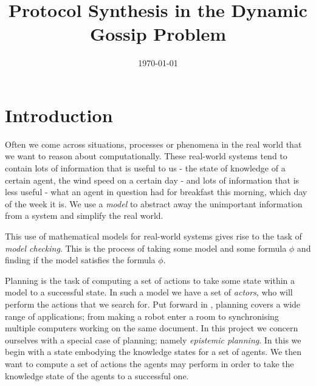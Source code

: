 \documentclass[ %
                    author={Leo Poulson},
                supervisor={Dr. Steven Ramsay},
                    degree={BSc},
                     title={Epistemic Planning for the Dynamic Gossip problem},
                  subtitle={},
                      year={2019} ]{dissertation}
\title{Protocol Synthesis in the Dynamic Gossip Problem} %
\author{
	\authorstyle{Leo Poulson}
	\newline\newline %
}
\date{\today}
\begin{document}
\frontmatter

\maketitle

\makedecl

\makeabst

\tableofcontents


\mainmatter

\chapter{Introduction}
\label{sec:Introduction}

Often we come across situations, processes or phenomena in the real world that
we want to reason about computationally. These real-world systems tend to
contain lots of information that is useful to us - the state of knowledge of a
certain agent, the wind speed on a certain day - and lots of information that is
less useful - what an agent in question had for breakfast this morning, which
day of the week it is. We use a \emph{model} to abstract away the unimportant
information from a system and simplify the real world. 

This use of mathematical models for real-world systems gives rise to the task of
\emph{model checking}. This is the process of taking some model  and some
formula $\phi$ and finding if the model  satisfies the formula $\phi$.

Planning is the task of computing a set of actions to take some state within a
model to a successful state. In such a model we have a set of \emph{actors}, who
will perform the actions that we search for. Put forward in
\cite{PlanningBook}, planning covers a wide range of applications; from making a
robot enter a room to synchronising multiple computers working on the same
document. In this project we concern ourselves with a special case of planning;
namely \emph{epistemic planning}. In this we begin with a state embodying the
knowledge states for a set of agents. We then want to compute a set of actions
the agents may perform in order to take the knowledge state of the agents to a
successful one.
\end{document}
